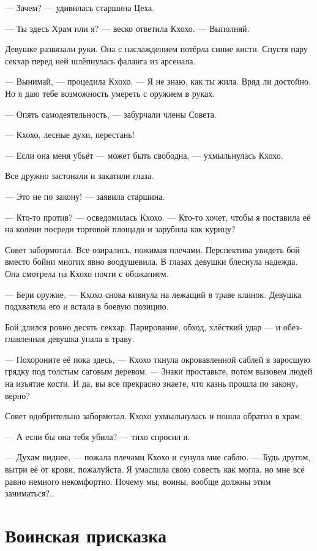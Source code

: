 \documentclass[a4paper,12pt,fleqn]{book}\usepackage{polyglossia}\setdefaultlanguage[babelshorthands=true]{russian}\setotherlanguage{english}\defaultfontfeatures{Ligatures=TeX,Mapping=tex-text}\usepackage{xcolor}\newcommand{\ml}[3]{#2}
\begin{document}
{--- Зачем? --- удивилась старшина Цеха.

--- Ты здесь Храм или я? --- веско ответила Кхохо.
--- Выполняй.

Девушке развязали руки.
Она с наслаждением потёрла синие кисти.
Спустя пару секхар перед ней шлёпнулась фаланга из арсенала.

--- Вынимай, --- процедила Кхохо.
--- Я не знаю, как ты жила.
Вряд ли достойно.
Но я даю тебе возможность умереть с оружием в руках.

--- Опять самодеятельность, --- забурчали члены Совета.

--- Кхохо, лесные духи, перестань!

--- Если она меня убьёт --- может быть свободна, --- ухмыльнулась Кхохо.

Все дружно застонали и закатили глаза.

--- Это не по закону! --- заявила старшина.

--- Кто-то против? --- осведомилась Кхохо.
--- Кто-то хочет, чтобы я поставила её на колени посреди торговой площади и зарубила как курицу?

Совет забормотал.
Все озирались, пожимая плечами.
Перспектива увидеть бой вместо бойни многих явно воодушевила.
В глазах девушки блеснула надежда.
Она смотрела на Кхохо почти с обожанием.

--- Бери оружие, --- Кхохо снова кивнула на лежащий в траве клинок.
Девушка подхватила его и встала в боевую позицию.

Бой длился ровно десять секхар.
Парирование, обход, хлёсткий удар --- и обезглавленная девушка упала в траву.

--- Похороните её пока здесь, --- Кхохо ткнула окровавленной саблей в заросшую грядку под толстым саговым деревом.
--- Знаки проставьте, потом вызовем людей на изъятие кости.
И да, вы все прекрасно знаете, что казнь прошла по закону, верно?

Совет одобрительно забормотал.
Кхохо ухмыльнулась и пошла обратно в храм.

--- А если бы она тебя убила? --- тихо спросил я.

--- Духам виднее, --- пожала плечами Кхохо и сунула мне саблю.
--- Будь другом, вытри её от крови, пожалуйста.
Я умаслила свою совесть как могла, но мне всё равно немного некомфортно.
Почему мы, воины, вообще должны этим заниматься?..

\section{Воинская присказка}

}
\end{document}
